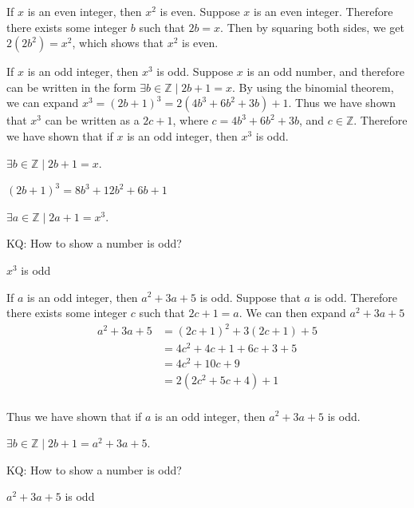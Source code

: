 \documentclass[openany, 12pt]{book}
\begin{document}
\begin{exercise}{}{}
	If $x$ is an even integer, then $x^2$ is even.
	\tcblower
	Suppose $x$ is an even integer. Therefore there exists some integer $b$ such that
	$2b=x$.  Then by squaring both sides, we get $2(2b^2)=x^2$, which shows that
	$x^2$ is even.
\end{exercise}

\begin{exercise}{}{}
	If $x$ is an odd integer, then $x^3$ is odd.
	\tcblower
	Suppose $x$ is an odd number, and therefore can be written in the form
	$\exists b\in\mathbb{Z}\mid 2b+1=x$.  By using the binomial theorem, we can
	expand $x^3=(2b+1)^3=2(4b^3 + 6b^2 + 3b) + 1$.  Thus we have shown that
	$x^3$ can be written as a $2c+1$, where $c= 4b^3 + 6b^2 + 3b$, and
	$c\in\mathbb{Z}$. Therefore we have shown that if $x$ is an odd integer,
	then $x^3$ is odd.

	\begin{alist}
		\item $\exists b\in\mathbb{Z}\mid 2b+1=x$.
		\item $(2b+1)^3=8b^3 + 12b^2 + 6b + 1$
		\item $\exists a\in\mathbb{Z}\mid 2a+1=x^3$.
		\item KQ: How to show a number is odd?
		\item $x^3$ is odd
	\end{alist}
\end{exercise}

\begin{exercise}{}{}
	If $a$ is an odd integer, then $a^2+3 a+5$ is odd.
	\tcblower
	Suppose that $a$ is odd.  Therefore there exists some integer $c$ such that
	$2c+1=a$.  We can then expand $a^2+3 a+5$
	\begin{align*}
		a^2+3 a+5 & = (2c+1)^2+3(2c+1)+5 \\
		          & = 4c^2+4c+1+6c+3+5   \\
		          & = 4c^2+10c+9         \\
		          & = 2(2c^2+5c+4)+1     \\
	\end{align*}

	Thus we have shown that if $a$ is an odd integer, then $a^2+3 a+5$ is odd.

	\begin{alist}
		\item $\exists b\in\mathbb{Z}\mid 2b+1=a^2+3 a+5$.
		\item KQ: How to show a number is odd?
		\item $a^2+3 a+5$ is odd
	\end{alist}
\end{exercise}
\end{document}
